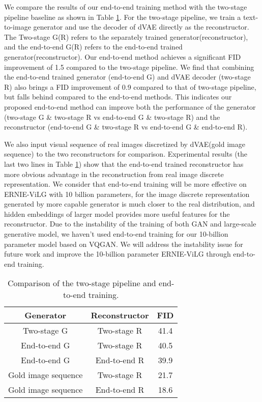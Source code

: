 \documentclass{article}
\begin{document}
We compare the results of our end-to-end training method with the two-stage pipeline baseline as shown in Table \ref{tab:end2end-gen-result}. For the two-stage pipeline, we train a text-to-image generator and use the decoder of dVAE directly as the reconstructor. The Two-stage G(R) refers to the separately trained generator(reconstructor), and the end-to-end G(R) refers to the end-to-end trained generator(reconstructor). Our end-to-end method achieves a significant FID improvement of 1.5 compared to the two-stage pipeline. 
We find that combining the end-to-end trained generator (end-to-end G) and dVAE decoder (two-stage R) also brings a FID improvement of 0.9 compared to that of two-stage pipeline, but falls behind compared to the end-to-end methods. This indicates our proposed end-to-end method can improve both the performance of the generator (two-stage G \& two-stage R vs end-to-end G \& two-stage R) and the reconstructor (end-to-end G \& two-stage R vs end-to-end G \& end-to-end R).  

We also input visual sequence of real images discretized by dVAE(gold image sequence) to the two reconstructors for comparison. Experimental results (the last two lines in Table \ref{tab:end2end-gen-result}) show that the end-to-end trained reconstructor has more obvious advantage in the reconstruction from real image discrete representation. We consider that end-to-end training will be more effective on ERNIE-ViLG with 10 billion parameters, for the image discrete representation generated by more capable generator is much closer to the real distribution, and hidden embeddings of larger model provides more useful features for the reconstructor. Due to the instability of the training of both GAN and large-scale generative model, we haven't used end-to-end training for our 10-billion parameter model based on VQGAN. We will address the instability issue for future work and improve the 10-billion parameter ERNIE-ViLG through end-to-end training.

\begin{table}[htb]
  \caption{Comparison of the two-stage pipeline and end-to-end training.}
  \begin{tabular}{c|c|c}
    \toprule
    Generator & Reconstructor  & FID  \\
    \midrule
    Two-stage G & Two-stage R & 41.4 \\
    End-to-end G & Two-stage R &  40.5 \\
    End-to-end G & End-to-end R & 39.9 \\
    Gold image sequence & Two-stage R & 21.7 \\
    Gold image sequence & End-to-end R & 18.6 \\
    \bottomrule
  \end{tabular}
  \label{tab:end2end-gen-result}
  \centering
\end{table}
\end{document}
